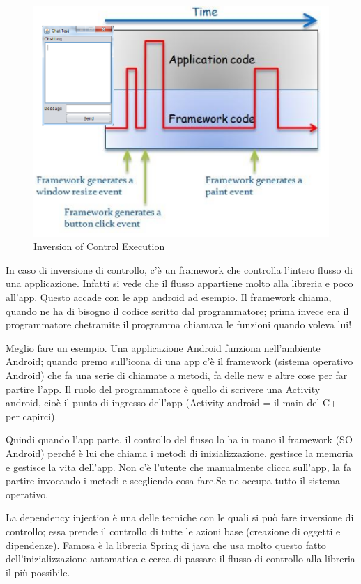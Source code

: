 \begin{figure}[H]
\centering
\includegraphics[scale=0.8]{images/ioc2}
\caption{Inversion of Control Execution\label{fig:UC3}}
\end{figure}
In caso di inversione di controllo, c'è un framework che controlla l'intero flusso di una applicazione. Infatti si vede che il flusso appartiene molto alla libreria e poco all'app. Questo accade con le app android ad esempio. Il framework chiama, quando ne ha di bisogno il codice scritto dal programmatore; prima invece era il programmatore chetramite il programma chiamava le funzioni quando voleva lui!

Meglio fare un esempio. Una applicazione Android funziona nell'ambiente Android; quando premo sull'icona di una app c'è il framework (sistema operativo Android) che fa una serie di chiamate a metodi, fa delle new e altre cose per far partire l'app. Il ruolo del programmatore è quello di scrivere una Activity android, cioè il punto di ingresso dell'app (Activity android = il main del C++ per capirci).

Quindi quando l'app parte, il controllo del flusso lo ha in mano il framework (SO Android) perché è lui che chiama i metodi di inizializzazione, gestisce la memoria e gestisce la vita dell'app. Non c'è l'utente che manualmente clicca sull'app, la fa partire invocando i metodi e scegliendo cosa fare.Se ne occupa tutto il sistema operativo.

La dependency injection è una delle tecniche con le quali si può fare inversione di controllo; essa prende il controllo di tutte le azioni base (creazione di oggetti e dipendenze). Famosa è la libreria Spring di java che usa molto questo fatto dell'inizializzazione automatica e cerca di passare il flusso di controllo alla libreria il più possibile.